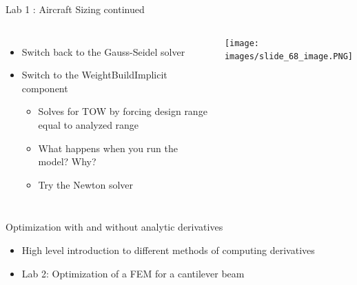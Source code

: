 \documentclass[aspectratio=169, usenames,dvipsnames, 14pt]{beamer}
\begin{document}
\begin{frame}{Lab 1 : Aircraft Sizing continued}
    \begin{columns}
    \hspace{-1cm}
    
            \begin{itemize}
                \item Switch back to the Gauss-Seidel solver
                
                \vspace{0.25cm}
                \item Switch to the WeightBuildImplicit component

                    \begin{itemize}
                        \item Solves for TOW by forcing design range equal to analyzed range
                        \item What happens when you run the model? Why?
                        \item Try the Newton solver
                    \end{itemize}
            \end{itemize}
            
            \texttt{[image: images/slide\_68\_image.PNG]}
    \end{columns}
\end{frame}
    

\begingroup
{}
\begin{frame}{Optimization with and without analytic derivatives}

    \begin{itemize}
        \item High level introduction to different methods of computing derivatives
        \vspace{0.5cm}
        \item Lab 2: Optimization of a FEM for a cantilever beam
    \end{itemize}
    
\end{frame}
\endgroup

\end{document}
